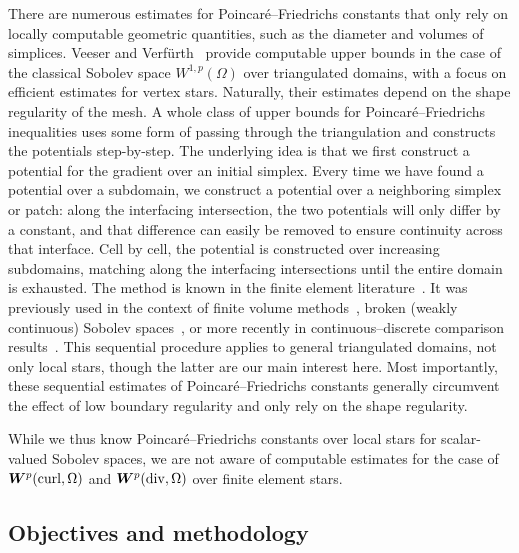 \documentclass[10pt,a4paper]{article}
\begin{document}
There are numerous estimates for Poincar\'e--Friedrichs constants that only rely on locally computable geometric quantities, such as the diameter and volumes of simplices.
Veeser and Verf\"urth~\cite{veeser2012poincare} provide computable upper bounds in the case of the classical Sobolev space $W^{1,p}(\Omega)$ over triangulated domains, with a focus on efficient estimates for vertex stars. Naturally, their estimates depend on the shape regularity of the mesh.
A whole class of upper bounds for Poincar\'e--Friedrichs inequalities uses some form of passing through the triangulation and constructs the potentials step-by-step.
The underlying idea is that we first construct a potential for the gradient over an initial simplex.
Every time we have found a potential over a subdomain, we construct a potential over a neighboring simplex or patch:
along the interfacing intersection, the two potentials will only differ by a constant,
and that difference can easily be removed to ensure continuity across that interface.
Cell by cell, the potential is constructed over increasing subdomains, matching along the interfacing intersections until the entire domain is exhausted.
The method is known in the finite element literature~\cite{ern2021finite}.
It was previously used in the context of finite volume methods~\cite{Eym_Gal_Her_00}, broken (weakly continuous) Sobolev spaces~\cite{vohralik2005discrete}, or more recently in continuous--discrete comparison results~\cite{Brae_Pill_Sch_p_rob_09, ern2020stable, Chaum_Voh_p_rob_3D_H_curl_24,  Voh_loc_glob_H1_24}.
This sequential procedure applies to general triangulated domains, not only local stars, though the latter are our main interest here.
Most importantly, these sequential estimates of Poincar\'e--Friedrichs constants generally circumvent the effect of low boundary regularity and only rely on the shape regularity.

While we thus know Poincar\'e--Friedrichs constants over local stars for scalar-valued Sobolev spaces,
we are not aware of computable estimates for the case of $\bm{W}^{p}(\operatorname{curl},\Omega)$ and $\bm{W}^{p}(\operatorname{div},\Omega)$ over finite element stars.






\subsection{Objectives and methodology}
\end{document}
